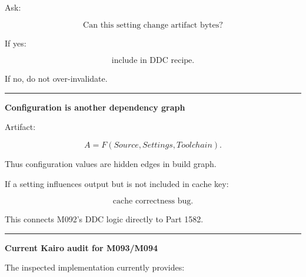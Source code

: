 Ask:

\[
\text{Can this setting change artifact bytes?}
\]

If yes:

\[
\text{include in DDC recipe}.
\]

If no, do not over-invalidate.

\begin{center}\rule{0.5\linewidth}{0.5pt}\end{center}

\textbf{Configuration is another dependency graph}

Artifact:

\[
A=F(Source,Settings,Toolchain).
\]

Thus configuration values are hidden edges in build graph.

If a setting influences output but is not included in cache key:

\[
\text{cache correctness bug}.
\]

This connects M092's DDC logic directly to Part 1582.

\begin{center}\rule{0.5\linewidth}{0.5pt}\end{center}

\textbf{Current Kairo audit for M093/M094}

The inspected implementation currently provides:

